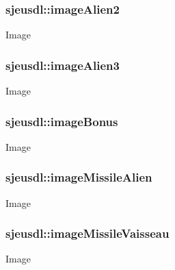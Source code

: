 \subsubsection[{\texorpdfstring{image\+Alien2}{imageAlien2}}]{ sjeusdl\+::image\+Alien2}\hypertarget{structsjeusdl_acb390de49c7f64984691010a1d7d17bf}{}\label{structsjeusdl_acb390de49c7f64984691010a1d7d17bf}
Image 
\subsubsection[{\texorpdfstring{image\+Alien3}{imageAlien3}}]{ sjeusdl\+::image\+Alien3}\hypertarget{structsjeusdl_aaf39c6f8b27b928d90cc062d0251a133}{}\label{structsjeusdl_aaf39c6f8b27b928d90cc062d0251a133}
Image 
\subsubsection[{\texorpdfstring{image\+Bonus}{imageBonus}}]{ sjeusdl\+::image\+Bonus}\hypertarget{structsjeusdl_a80c364b2a14ba9ab480645d7d7a11493}{}\label{structsjeusdl_a80c364b2a14ba9ab480645d7d7a11493}
Image 
\subsubsection[{\texorpdfstring{image\+Missile\+Alien}{imageMissileAlien}}]{ sjeusdl\+::image\+Missile\+Alien}\hypertarget{structsjeusdl_ad73015b116a49ece7c301fca33ea49b1}{}\label{structsjeusdl_ad73015b116a49ece7c301fca33ea49b1}
Image 
\subsubsection[{\texorpdfstring{image\+Missile\+Vaisseau}{imageMissileVaisseau}}]{ sjeusdl\+::image\+Missile\+Vaisseau}\hypertarget{structsjeusdl_a61937ce283d29bad48aa57249ea264e7}{}\label{structsjeusdl_a61937ce283d29bad48aa57249ea264e7}
Image 
